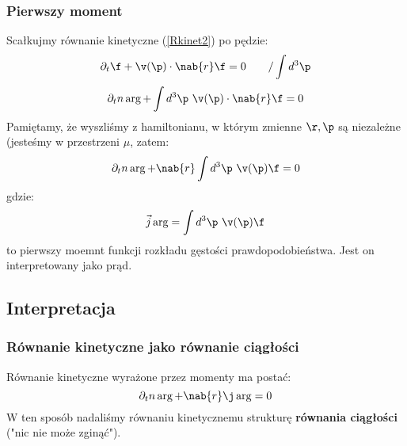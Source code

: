 \subsubsection{Pierwszy moment}
Scałkujmy równanie kinetyczne (\ref{Rkinet2}) po pędzie:
\begin{equation}\partial_t\f+\v(\p)\cdot\nab{r}\f=0~~~~~~/\int d^3 \p\nonumber \end {equation}
\begin{equation}\partial_t n\arg+\int d^3\p ~\v(\p)\cdot\nab{r}\f=0 \nonumber\end{equation}
Pamiętamy, że wyszliśmy z hamiltonianu, w którym zmienne $\r,\p$ są niezależne (jesteśmy w przestrzeni $\mu$, zatem:
\begin{equation}\partial_t n\arg+\nab{r}\int d^3\p~\v(\p)\f=0 \nonumber\end{equation}
gdzie:
\begin{equation}\vec{j}\arg=\int d^3\p~\v(\p)\f\end{equation}
to pierwszy moemnt funkcji rozkładu gęstości prawdopodobieństwa. Jest on interpretowany jako prąd.
\subsection{Interpretacja}
\subsubsection{Równanie kinetyczne jako równanie ciągłości}
Równanie kinetyczne wyrażone przez momenty ma postać:
\begin{equation}\partial_t n\arg+\nab{r}\j\arg=0\end{equation}
W ten sposób nadaliśmy równaniu kinetycznemu strukturę \textbf{równania ciągłości} ("nic nie może zginąć").
